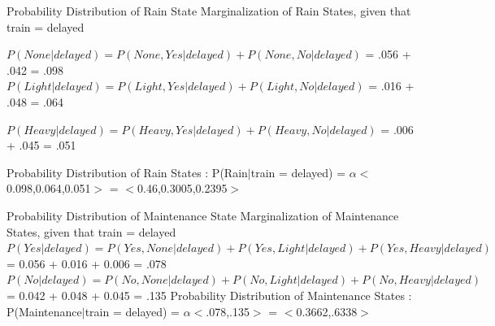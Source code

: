 \documentclass{beamer}
\begin{document}
\begin{frame}{Probability Distribution of Rain State}
    Marginalization of Rain States, given that train = delayed  \newline\newline
    {\small $P(None|delayed) = P(None, Yes|delayed) + P(None, No|delayed)$ \newline
        = .056 + .042 = .098
        \newline\newline
    $P(Light|delayed) = P(Light, Yes|delayed) + P(Light, No|delayed)$ \newline
        = .016 + .048 = .064 \newline\newline
        
    $P(Heavy|delayed) = P(Heavy, Yes|delayed) + P(Heavy, No|delayed)$ \newline
        = .006 + .045 = .051}
    \newline\newline
    Probability Distribution of Rain States : \newline
    P(Rain$|$train = delayed) \newline = $\alpha<$0.098,0.064,0.051$>$ \newline = $<$0.46,0.3005,0.2395$>$ 
    
\end{frame}

\begin{frame}{Probability Distribution of Maintenance State}
    Marginalization of Maintenance States, given that train = delayed \newline\newline
        {\small $P(Yes|delayed) = P(Yes,None|delayed) + P(Yes, Light|delayed) + P(Yes,Heavy|delayed)$ 
    = 0.056 + 0.016 + 0.006 = .078}\newline\newline
    {\small $P(No|delayed) = P(No,None|delayed) + P(No, Light|delayed) + P(No,Heavy|delayed)$
    = 0.042 + 0.048 + 0.045 = .135}
    \newline\newline
    Probability Distribution of Maintenance States : \newline 
    P(Maintenance$|$train = delayed) \newline = $\alpha<$.078,.135$>$ \newline = $<$0.3662,.6338$>$ 
\end{frame}
\end{document}
